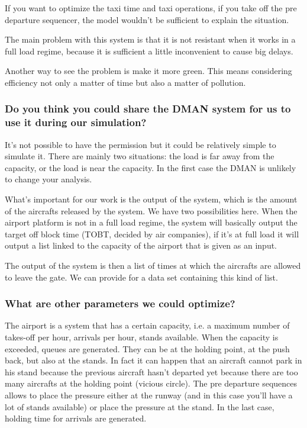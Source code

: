 \documentclass{article}
\begin{document}
If you want to optimize the taxi time and taxi operations, if you take off the pre departure sequencer, the model wouldn't be sufficient to explain the situation.

The main problem with this system is that it is not resistant when it works in a full load regime, because it is sufficient a little inconvenient to cause big delays.

Another way to see the problem is make it more green. This means considering efficiency not only a matter of time but also a matter of pollution.

\subsubsection*{Do you think you could share the DMAN system for us to use it during our simulation?}

It's not possible to have the permission but it could be relatively simple to simulate it. There are mainly two situations: the load is far away from the capacity, or the load is near the capacity. In the first case the DMAN is unlikely to change your analysis.

What's important for our work is the output of the system, which is the amount of the aircrafts released by the system.
We have two possibilities here. When the airport platform is not in a full load regime, the system will basically output the target off block time (TOBT, decided by air companies), if it's at full load it will output a list linked to the capacity of the airport that is given as an input.

The output of the system is then a list of times at which the aircrafts are allowed to leave the gate. We can provide for a data set containing this kind of list.

\subsubsection*{What are other parameters we could optimize?}

The airport is a system that has a certain capacity, i.e. a maximum number of takes-off per hour, arrivals per hour, stands available. When the capacity is exceeded, queues are generated. They can be at the holding point, at the push back, but also at the stands. In fact it can happen that an aircraft cannot park in his stand because the previous aircraft hasn't departed yet because there are too many aircrafts at the holding point (vicious circle). The pre departure sequences allows to place the pressure either at the runway (and in this case you'll have a lot of stands available) or place the pressure at the stand. In the last case, holding time for arrivals are generated.
\end{document}

